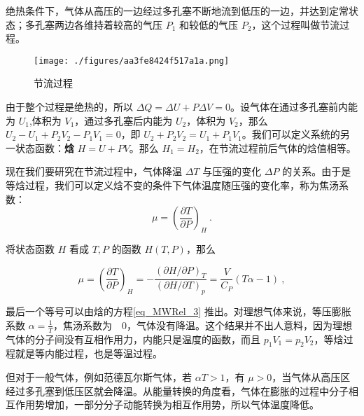 

绝热条件下，气体从高压的一边经过多孔塞不断地流到低压的一边，并达到定常状态；多孔塞两边各维持着较高的气压 $P_1$ 和较低的气压 $P_2$，这个过程叫做节流过程。

\begin{figure}[ht]
\centering
\texttt{[image: ./figures/aa3fe8424f517a1a.png]}
\caption{节流过程} \label{fig_ttpro_1}
\end{figure}

由于整个过程是绝热的，所以 $\Delta Q=\Delta U+P\Delta V=0$。设气体在通过多孔塞前内能为 $U_1$,体积为 $V_1$，通过多孔塞后内能为 $U_2$，体积为 $V_2$，那么 $U_2-U_1+P_2V_2-P_1V_1=0$，即 $U_2+P_2V_2=U_1+P_1V_1$。我们可以定义系统的另一状态函数：\textbf{焓} $H=U+PV$。那么 $H_1=H_2$，在节流过程前后气体的焓值相等。

现在我们要研究在节流过程中，气体降温 $\Delta T$ 与压强的变化 $\Delta P$ 的关系。由于是等焓过程，我们可以定义焓不变的条件下气体温度随压强的变化率，称为焦汤系数：
\begin{equation}
\mu=\left(\frac{\partial T}{\partial P}\right)_H~.
\end{equation}

将状态函数 $H$ 看成 $T,P$ 的函数 $H(T,P)$，那么

\begin{equation}
\mu=\left(\frac{\partial T}{\partial P}\right)_H=
-\frac{(\partial H/\partial P)_T}{(\partial H/\partial T)_p}
=\frac{V}{C_P}(T\alpha-1)~,
\end{equation}

最后一个等号可以由焓的方程\autoref{eq_MWRel_3} 推出。对理想气体来说，等压膨胀系数 $\alpha=\frac{1}{T}$，焦汤系数为　$0$，气体没有降温。这个结果并不出人意料，因为理想气体的分子间没有互相作用力，内能只是温度的函数，而且 $p_1V_1=p_2V_2$，等焓过程就是等内能过程，也是等温过程。

但对于一般气体，例如范德瓦尔斯气体，若 $\alpha T>1$，有 $\mu>0$，当气体从高压区经过多孔塞到低压区就会降温。从能量转换的角度看，气体在膨胀的过程中分子相互作用势增加，一部分分子动能转换为相互作用势，所以气体温度降低。